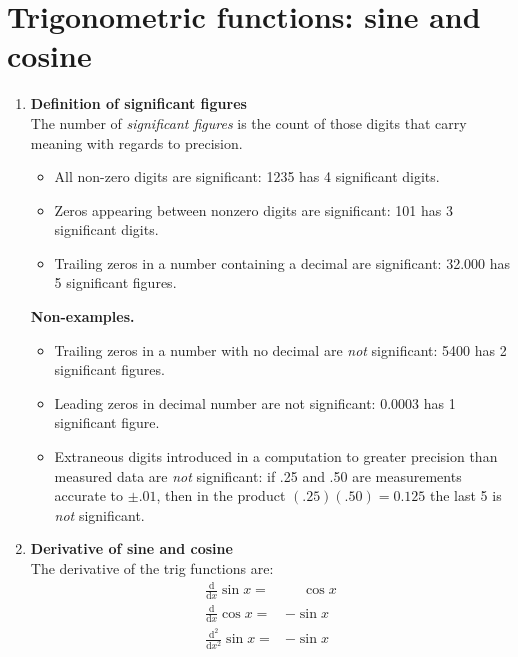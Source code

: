 \section{Trigonometric functions: sine and cosine}
\begin{enumerate}
    \item \textbf{Definition of significant figures}\\
        \indent The number of \textit{significant figures} is the count of those digits that carry meaning with regards to precision.\par
        \begin{eg}\leavevmode
            \begin{itemize}
                \item All non-zero digits are significant: 1235 has 4 significant digits.
                \item Zeros appearing between nonzero digits are significant: 101 has 3 significant digits.
                \item Trailing zeros in a number containing a decimal are significant: 32.000 has 5 significant figures.
            \end{itemize}
            \textsf{\textbf{\color{NavyBlue!70!Black}Non-examples.}}
            \begin{itemize}
                \item Trailing zeros in a number with no decimal are \textit{not} significant: 5400 has 2 significant figures.
                \item Leading zeros in decimal number are not significant: 0.0003 has 1 significant figure.
                \item Extraneous digits introduced in a computation to greater precision than measured data are \textit{not} significant: if .25 and .50 are measurements accurate to \(\pm.01\), then in the product \((.25)(.50)=0.125\) the last 5 is \textit{not} significant.
            \end{itemize}
        \end{eg}
    \item \textbf{Derivative of sine and cosine}\\
        \indent The derivative of the trig functions are:
        \begin{align*}
            \frac{\mathrm{d}}{\mathrm{d}x}\sin x= & \mathbin{\phantom{-}}\cos x\\
            \frac{\mathrm{d}}{\mathrm{d}x}\cos x= & -\sin x\\
            \frac{\mathrm{d}^2}{\mathrm{d}x^2}\sin x= & -\sin x\\

\end{align*}
\end{enumerate}

